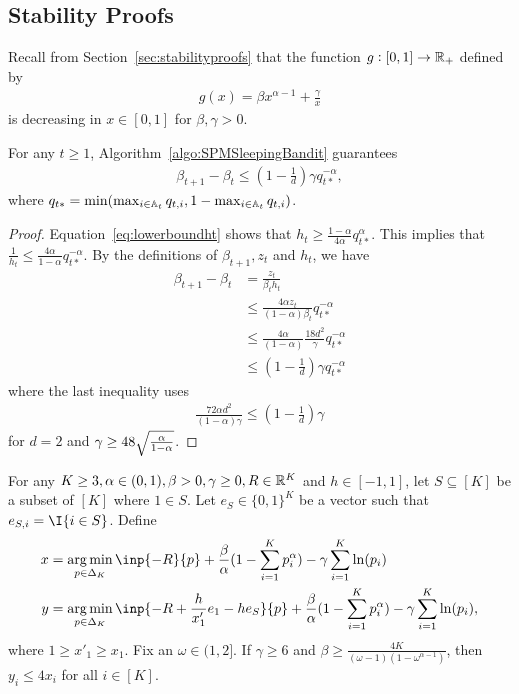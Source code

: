 \subsection{Stability Proofs}
Recall from Section~\ref{sec:stabilityproofs} that the function $g: [0,1] \to \mathbb{R}_+$ defined by
\begin{align*}
    g(x) = \beta x^{\alpha-1} + \frac{\gamma}{x}
\end{align*}
is decreasing in $x \in [0, 1]$ for $\beta, \gamma > 0$.
\begin{lemma}
    For any $t \geq 1$, Algorithm~\ref{algo:SPMSleepingBandit} guarantees
    \begin{align}
        \beta_{t+1} - \beta_t \leq (1 - \frac{1}{d})\gamma q_{t*}^{-\alpha},
    \end{align}
    where $q_{t*} = \min(\max_{i \in {\mathbb{A}}_t}q_{t,i}, 1 - \max_{i \in {\mathbb{A}}_t}q_{t,i})$.
    \label{lemma:betatplus1isgoodSB}
\end{lemma}
\begin{proof}
    Equation~\eqref{eq:lowerboundht} shows that $h_t \geq \frac{1-\alpha}{4\alpha}q_{t*}^{\alpha}$. This implies that $\frac{1}{h_t} \leq \frac{4\alpha}{1-\alpha}q_{t*}^{-\alpha}$.
    By the definitions of $\beta_{t+1}, z_t$ and $h_t$, we have 
    \begin{align*}
        \beta_{t+1} - \beta_t &= \frac{z_t}{\beta_t h_t} \\
        &\leq \frac{4\alpha z_t}{(1-\alpha)\beta_t}q_{t*}^{-\alpha} \\
        &\leq \frac{4\alpha}{(1-\alpha)} \frac{18d^2}{\gamma}q_{t*}^{-\alpha} \\
        &\leq (1-\frac{1}{d})\gamma q_{t*}^{-\alpha}
    \end{align*}
    where the last inequality uses
    \begin{align}
        \frac{72\alpha d^2}{(1-\alpha)\gamma} \leq (1-\frac{1}{d})\gamma
    \end{align}
    for $d = 2$ and $\gamma \geq 48\sqrt{\frac{\alpha}{1-\alpha}}$.
\end{proof}
\begin{lemma}
    For any $K \geq 3, \alpha \in (0,1), \beta > 0, \gamma \geq 0, R \in \mathbb{R}^K$ and $h \in [-1,1]$, let $S \subseteq [K]$ be a subset of $[K]$ where $1 \in S$. Let $e_S \in \{0,1\}^K$ be a vector such that $e_{S,i} = \I{i \in S}$. Define 
    \begin{align*}
        x &= \argmin_{p \in \Delta_K}\inp{-R}{p} + \frac{\beta}{\alpha}(1 - \sum_{i=1}^K p_i^\alpha) - \gamma\sum_{i=1}^K \ln(p_i) \\
        y &= \argmin_{p \in \Delta_K}\inp{-R + \frac{h}{x_1'}e_1 - he_S}{p} + \frac{\beta}{\alpha}(1 - \sum_{i=1}^K p_i^\alpha) - \gamma\sum_{i=1}^K \ln(p_i),
    \end{align*}
    where $1 \geq x'_1 \geq x_1$. Fix an $\omega \in (1, 2]$. If $\gamma \geq 6$ and $\beta \geq \frac{4K}{(\omega - 1)(1 - \omega^{\alpha - 1})}$, then $y_i \leq 4x_i$ for all $i \in [K]$.
    \label{lemma:stableSameBetaDiffLossSB}
\end{lemma}

